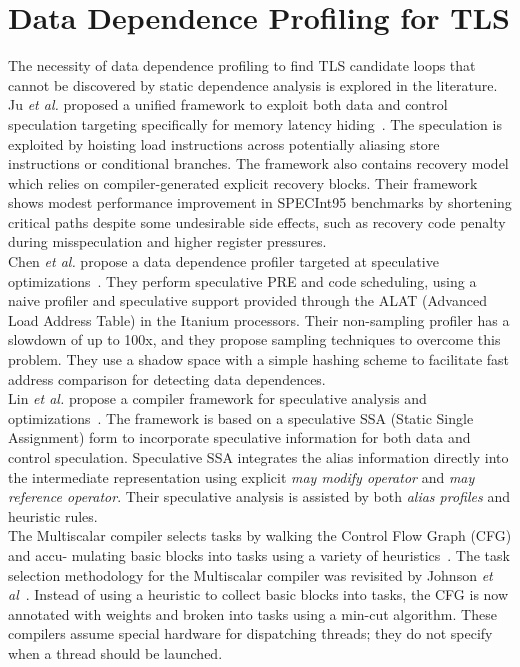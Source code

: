 \documentclass[10pt]{report}          %
\begin{document}
\section{Data Dependence Profiling for TLS}

The necessity of data dependence profiling to find TLS candidate loops that cannot be discovered by static dependence analysis is explored in the literature.\\
Ju \textit{et al.} proposed a unified framework to exploit both data and control speculation targeting specifically for memory latency hiding~\cite{ju_spec}. The speculation is exploited by hoisting load instructions across potentially aliasing store instructions or conditional branches.  The framework also contains recovery model which relies on compiler-generated explicit recovery blocks.  Their framework shows modest performance improvement in SPECInt95 benchmarks by shortening critical paths despite some undesirable side effects, such as recovery code penalty during misspeculation and higher register pressures.\\
Chen \textit{et al.} propose a data dependence profiler targeted at speculative optimizations~\cite{chen_spec}. They perform speculative PRE and code scheduling, using a naive profiler and speculative support provided through the ALAT (Advanced Load Address Table) in the Itanium processors. Their non-sampling profiler has a slowdown of up to 100x, and they propose sampling techniques to overcome this problem. They use a shadow space with a simple hashing scheme to facilitate fast address comparison for detecting data dependences.\\
Lin \textit{et al.} propose a compiler framework for speculative analysis and optimizations~\cite{lin_spec}.  The framework is based on a speculative SSA (Static Single Assignment) form to incorporate speculative information for both data and control speculation.  Speculative SSA integrates the alias information directly into the intermediate representation using explicit \textit{may modify operator} and \textit{may reference operator}. Their speculative analysis is assisted by both \textit{alias profiles} and heuristic rules.\\
The Multiscalar compiler selects tasks by walking the Control Flow Graph (CFG) and accu-
mulating basic blocks into tasks using a variety of heuristics~\cite{multiscalar}. The task selection methodology for the Multiscalar compiler was revisited by Johnson \textit{et al}~\cite{mincut}.  Instead of using a heuristic to collect basic blocks into tasks, the CFG is now annotated with weights and broken into tasks using a min-cut algorithm. These compilers assume special hardware for dispatching threads; they do not specify when a thread should be launched.\\
\end{document}
